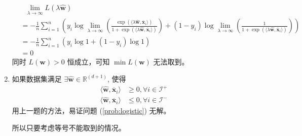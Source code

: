 \documentclass[11pt,letter,notitlepage]{article}
\begin{document}
\begin{solution}
\begin{enumerate}
		      $$\begin{aligned}
				       & \ \ \ \lim_{\lambda\to\infty}{L(\lambda \hat{\mathbf{w}})}                                                                                                                                                                                                                                                                                                                                      \\
				       & =-\frac{1}{n}\sum_{i=1}^n \left( y_i \log \lim_{\lambda\to\infty} \left( \frac{\exp(\langle \lambda \hat{\mathbf{w}},  \overline{\mathbf{x}}_i \rangle)}{1+\exp(\langle \lambda \hat{\mathbf{w}},  \overline{\mathbf{x}}_i \rangle) } \right) + (1-y_i)\log \lim_{\lambda\to\infty} \left( \frac{1}{1+\exp(\langle \lambda \hat{\mathbf{w}},  \overline{\mathbf{x}}_i \rangle)} \right) \right) \\
				       & = -\frac{1}{n}\sum_{i=1}^n \left( y_i \log 1  + (1-y_i)\log 1  \right)                                                                                                                                                                                                                                                                                                                          \\
				       & =0
			      \end{aligned}$$
		      同时 $L(\mathbf{w})>0$ 恒成立，可知 $\min L(\mathbf{w})$ 无法取到。
		\item 如果数据集满足 $\exists \hat{\mathbf{w}}\in\mathbb{R}^{(d+1)}$, 使得
		      $$\begin{aligned}
				      \langle \hat{\mathbf{w}},\overline{\mathbf{x}}_i \rangle & \ge 0, \forall i \in \mathcal{I}^+ \\
				      \langle \hat{\mathbf{w}},\overline{\mathbf{x}}_i \rangle & \le 0, \forall i \in \mathcal{I}^-
			      \end{aligned}$$
		      用上一题的方法，易证问题 (\ref{prob:logistic}) 无解。

		      所以只要考虑等号不能取到的情况。


\end{enumerate}
\end{solution}
\end{document}
